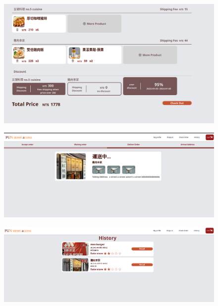 \documentclass[a4paper, 12pt]{article}
\begin{document}
\newline
{}
\begin{figure}[hp]
    \centerline{\includegraphics[width=40em]{gui-snapshot/customer/cart.png}}
    \label{fig:enter-label}
\end{figure}
\newpage
{}
\begin{figure}[hp]
    \centerline{\includegraphics[width=40em]{gui-snapshot/customer/check-order.png}}
    \label{fig:enter-label}
\end{figure}
\newline
{}
\begin{figure}[hp]
    \centerline{\includegraphics[width=40em]{gui-snapshot/customer/history.png}}
    \label{fig:enter-label}
\end{figure}
\newline
\newpage
\end{document}
